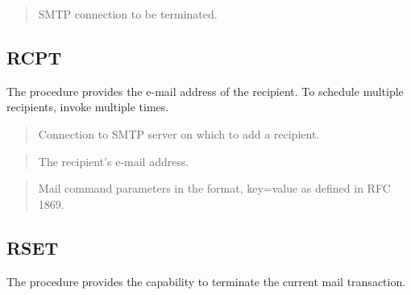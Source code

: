 \documentclass[letterpaper,10pt,english,openany,oneside]{sphinxmanual}
\begin{document}

\begin{quote}

SMTP connection to be terminated.
\end{quote}


\subsection{RCPT}
\label{\detokenize{utl_smtp:rcpt}}
The  procedure provides the e-mail address of the recipient. To
schedule multiple recipients, invoke  multiple times.
\begin{quote}


\end{quote}


\begin{quote}

Connection to SMTP server on which to add a recipient.
\end{quote}

\begin{quote}

The recipient’s e-mail address.
\end{quote}

\begin{quote}

Mail command parameters in the format, key=value as defined in RFC 1869.
\end{quote}


\subsection{RSET}
\label{\detokenize{utl_smtp:rset}}
The  procedure provides the capability to terminate the current mail
transaction.
\begin{quote}

\end{quote}
\end{document}
